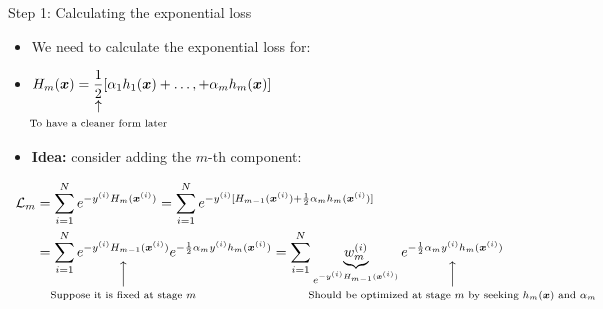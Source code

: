 \documentclass[serif, aspectratio=169]{beamer}
\makeatletter
\newcommand\vertarrowbox[3][6ex]{%
  \begin{array}[t]{@{}c@{}} #2 \\
  \left\uparrow\vcenter{\hrule height #1}\right.\kern-\nulldelimiterspace\\
  \makebox[0pt]{\scriptsize#3}
  \end{array}%
}
\makeatother
\begin{document}
\begin{frame}{Step 1: Calculating the exponential loss}
    \begin{itemize}
        \itemsep1em
        \justifying
        \item We need to calculate the exponential loss for:
        \item[] \begin{center}
            $H_m(\boldsymbol{x}) = 
            \text{\vertarrowbox[0ex]{\dfrac{1}{2}}{To have a cleaner form later}}
            [\alpha_1h_1(\boldsymbol{x})+\dots,+\alpha_mh_m(\boldsymbol{x})]$
        \end{center}
        \item \textbf{Idea:} consider adding the $m$-th component:
    \end{itemize}
    \begin{align*}
        \mathcal{L}_m &= \displaystyle\sum_{i=1}^N e^{-y^{(i)}H_m(\boldsymbol{x}^{(i)})} = \displaystyle\sum_{i=1}^N e^{-y^{(i)}[H_{m-1}(\boldsymbol{x}^{(i)}) + \frac{1}{2}\alpha_mh_m(\boldsymbol{x}^{(i)})]} \\
        &=\displaystyle\sum_{i=1}^N
        \text{\vertarrowbox[4ex]{e^{-y^{(i)}H_{m-1}(\boldsymbol{x}^{(i)})}}{Suppose it is fixed at stage $m$}}
        e^{-\frac{1}{2}\alpha_my^{(i)}h_m(\boldsymbol{x}^{(i)})}
        =\displaystyle\sum_{i=1}^N \underbrace{w_m^{(i)}}_{e^{-y^{(i)}H_{m-1}(\boldsymbol{x}^{(i)})}} 
        \text{\vertarrowbox[4ex]{e^{-\frac{1}{2}\alpha_my^{(i)}h_m(\boldsymbol{x}^{(i)})}}{Should be optimized at stage $m$ by seeking $h_m(\boldsymbol{x})$ and $\alpha_m$}}
    \end{align*}
\end{frame}
\end{document}
